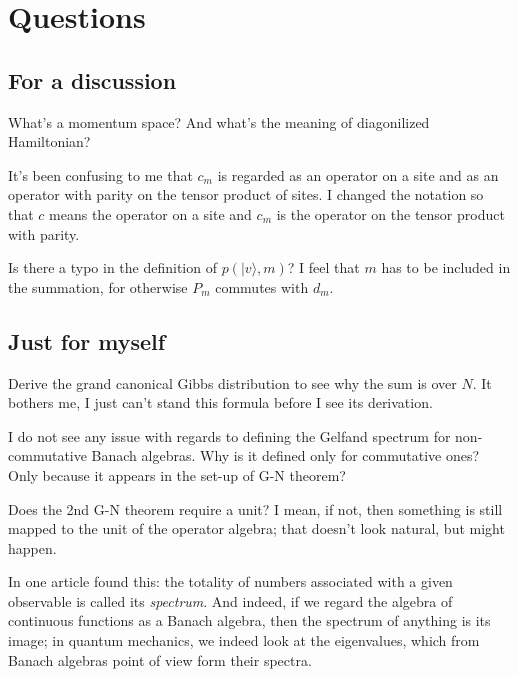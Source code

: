 \section{Questions}
\subsection{For a discussion}
\begin{quest}
What's a momentum space? And what's the meaning of diagonilized Hamiltonian?
\end{quest}
\begin{quest}
It's been confusing to me that $c_m$ is regarded as an operator on a site and as an operator with parity on the tensor product of sites. I changed the notation so that $c$ means the operator on a site and $c_m$ is the operator on the tensor product with parity.
\end{quest}
\begin{quest}
Is there a typo in the definition of $p(|v\rangle, m)$? I feel that $m$ has to be included in the summation, for otherwise $P_m$ commutes with $d_m$.
\end{quest}
\subsection{Just for myself}
\begin{quest}
Derive the grand canonical Gibbs distribution to see why the sum is over $N$. It bothers me, I just can't stand this formula before I see its derivation.
\end{quest}
\begin{quest}
I do not see any issue with regards to defining the Gelfand spectrum for non-commutative Banach algebras. Why is it defined only for commutative ones? Only because it appears in the set-up of G-N theorem?
\end{quest}
\begin{quest}
Does the 2nd G-N theorem require a unit? I mean, if not, then something is still mapped to the unit of the operator algebra; that doesn't look natural, but might happen.
\end{quest}

In one article found this: the totality of numbers associated with a given observable is called its \emph{spectrum}. And indeed, if we regard the algebra of continuous functions as a Banach algebra, then the spectrum of anything is its image; in quantum mechanics, we indeed look at the eigenvalues, which from Banach algebras point of view form their spectra.

